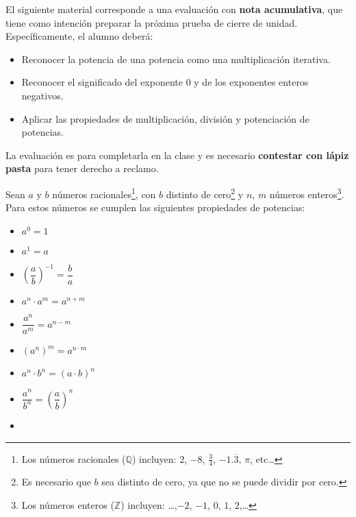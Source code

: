 \documentclass{prueba}
\begin{document}

El siguiente material corresponde a una evaluación con {\bfseries nota acumulativa}, que 
tiene como intención preparar la próxima prueba de cierre de unidad. Específicamente,
el alumno deberá:

\begin{itemize}[noitemsep]
    \item Reconocer la potencia de una potencia como una multiplicación iterativa.
    \item Reconocer el significado del exponente 0 y de los exponentes enteros 
    negativos.
    \item Aplicar las propiedades de multiplicación, división y potenciación de 
    potencias.
\end{itemize}

La evaluación es para completarla en la clase y es necesario {\bfseries contestar con lápiz pasta}
para tener derecho a reclamo.


Sean $a$ y $b$ números racionales\footnote{Los números racionales ($\mathbb{Q}$) incluyen: $2$, $-8$, $\frac{3}{4}$, $-1.\overline{3}$, $\pi$, etc\dots},
con $b$ distinto de cero\footnote{Es necesario que $b$ sea distinto de cero, ya que no se puede dividir por cero.}
y $n$, $m$ números enteros\footnote{Los números enteros ($\mathbb{Z}$) incluyen: \dots,$-2$, $-1$, $0$, $1$, $2$,\dots}. 
Para estos números se cumplen las siguientes propiedades de potencias:

\begin{multicols}{3}
    \begin{itemize}[label={$\color{primarycolor}\diamond$}]
        \item $a^0 = 1$
        \item $a^1 = a$
        \item $\left(\dfrac{a}{b}\right)^{-1} = \dfrac{b}{a}$
        \item $a^n \cdot a^m = a^{n+m}$
        \item $\dfrac{a^n}{a^m} = a^{n-m}$
        \item $\left(a^n\right)^m = a^{n\cdot m}$
        \item $a^n \cdot b^n = \left(a\cdot b\right)^n$
        \item $\dfrac{a^n}{b^n} = \left(\dfrac{a}{b}\right)^n$
        \item[\vspace{\fill}]
    \end{itemize}
\end{multicols}
\end{document}
